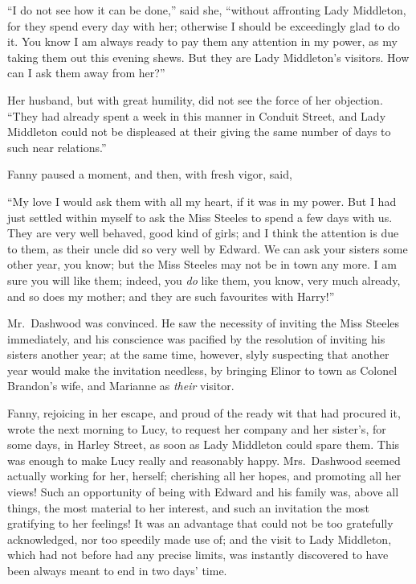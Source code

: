 \documentclass{article}
\begin{document}
``I do not see how it can be done,'' said she,
``without affronting Lady Middleton, for they spend every day
with her; otherwise I should be exceedingly glad to do it.
You know I am always ready to pay them any attention
in my power, as my taking them out this evening shews.
But they are Lady Middleton's visitors.  How can I ask them
away from her?''

Her husband, but with great humility, did not see
the force of her objection.  ``They had already spent a week
in this manner in Conduit Street, and Lady Middleton
could not be displeased at their giving the same number
of days to such near relations.''

Fanny paused a moment, and then, with fresh vigor, said,

``My love I would ask them with all my heart, if it
was in my power.  But I had just settled within myself
to ask the Miss Steeles to spend a few days with us.
They are very well behaved, good kind of girls; and I think
the attention is due to them, as their uncle did so very
well by Edward.  We can ask your sisters some other year,
you know; but the Miss Steeles may not be in town any more.
I am sure you will like them; indeed, you \emph{do} like them,
you know, very much already, and so does my mother; and they
are such favourites with Harry!''

Mr.\ Dashwood was convinced.  He saw the necessity
of inviting the Miss Steeles immediately, and his conscience
was pacified by the resolution of inviting his sisters
another year; at the same time, however, slyly suspecting
that another year would make the invitation needless,
by bringing Elinor to town as Colonel Brandon's wife,
and Marianne as \emph{their} visitor.

Fanny, rejoicing in her escape, and proud of the ready
wit that had procured it, wrote the next morning to Lucy,
to request her company and her sister's, for some days,
in Harley Street, as soon as Lady Middleton could spare them.
This was enough to make Lucy really and reasonably happy.
Mrs.\ Dashwood seemed actually working for her, herself;
cherishing all her hopes, and promoting all her views!
Such an opportunity of being with Edward and his family was,
above all things, the most material to her interest,
and such an invitation the most gratifying to her
feelings!  It was an advantage that could not be too
gratefully acknowledged, nor too speedily made use of;
and the visit to Lady Middleton, which had not before had
any precise limits, was instantly discovered to have been
always meant to end in two days' time.
\end{document}
